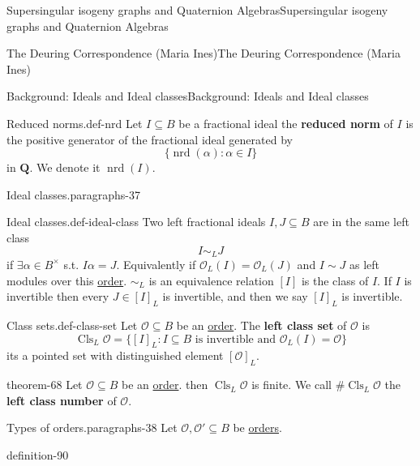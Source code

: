 \documentclass[10pt,]{book}
\newcommand{\terminology}[1]{\textbf{#1}}
\numberwithin{equation}{section}
\newcommand{\lb}{[}
\newcommand{\rb}{]}
\newcommand{\QQ}{\mathbf{Q}}
\newcommand{\ints}{\mathcal{O}}
\begin{document}
\begin{chapterptx}{Supersingular isogeny graphs and Quaternion Algebras}{}{Supersingular isogeny graphs and Quaternion Algebras}{}{}
\begin{sectionptx}{The Deuring Correspondence (Maria Ines)}{}{The Deuring Correspondence (Maria Ines)}{}{}
\begin{subsectionptx}{Background: Ideals and Ideal classes}{}{Background: Ideals and Ideal classes}{}{}
\begin{definition}{Reduced norms.}{def-nrd}%
\hypertarget{p-944}{}%
Let \(I \subseteq B\) be a fractional ideal the \terminology{reduced norm} of \(I \) is the positive generator of the fractional ideal generated by%
\begin{equation*}
\{ \operatorname{nrd} (\alpha) :  \alpha \in I \}
\end{equation*}
in \(\QQ\). We denote it \(\operatorname{nrd}(I)\).%
\end{definition}
\begin{paragraphs}{Ideal classes.}{paragraphs-37}%
\begin{definition}{Ideal classes.}{def-ideal-class}%
\hypertarget{p-945}{}%
Two left fractional ideals \(I,J \subseteq B\) are in the same left class%
\begin{equation*}
I\sim_L J
\end{equation*}
if \(\exists  \alpha \in B^\times\) s.t. \(I\alpha = J\). Equivalently if \(\ints_L(I)  = \ints_L(J)\) and \(I \sim J\) as left modules over this \hyperref[def-order-quaternion]{order}. \(\sim_L\) is an equivalence relation \(\lb I \rb\) is the class of \(I\). If \(I \) is invertible then every \(J \in \lb I \rb_L\) is invertible, and then we say \(\lb I \rb_L \) is invertible.%
\end{definition}
\begin{definition}{Class sets.}{def-class-set}%
\hypertarget{p-946}{}%
Let \(\ints \subseteq B\) be an \hyperref[def-order-quaternion]{order}. The \terminology{left class set} of \(\ints\) is%
\begin{equation*}
\operatorname{Cls}_L \ints   = \{ \lb I \rb_L : I \subseteq B \text{ is invertible  and } \ints_L(I) = \ints\}
\end{equation*}
its a pointed set with distinguished element \(\lb \ints \rb_L\).%
\end{definition}
\begin{theorem}{}{}{theorem-68}%
\hypertarget{p-947}{}%
Let \(\ints \subseteq B\) be an \hyperref[def-order-quaternion]{order}. then \(\operatorname{Cls} _L \ints\) is finite. We call \(\# \operatorname{Cls}_L\ints \) the \terminology{left class number} of \(\ints\).%
\end{theorem}
\end{paragraphs}%
\begin{paragraphs}{Types of orders.}{paragraphs-38}%
\hypertarget{p-948}{}%
Let \(\ints ,\ints'  \subseteq B\) be \hyperref[def-order-quaternion]{orders}.%
\begin{definition}{}{definition-90}%

\end{definition}
\end{paragraphs}
\end{subsectionptx}
\end{sectionptx}
\end{chapterptx}
\end{document}
